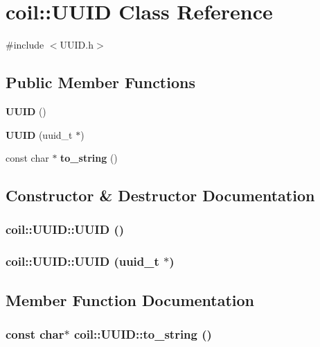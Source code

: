 \section{coil::UUID Class Reference}
\label{classcoil_1_1UUID}


{\ttfamily \#include $<$UUID.h$>$}

\subsection*{Public Member Functions}
\begin{DoxyCompactItemize}
\item 
{\bf UUID} ()
\item 
{\bf UUID} (uuid\_\-t $\ast$)
\item 
const char $\ast$ {\bf to\_\-string} ()
\end{DoxyCompactItemize}


\subsection{Constructor \& Destructor Documentation}
\subsubsection[{UUID}]{\setlength{\rightskip}{0pt plus 5cm}coil::UUID::UUID ()}\label{classcoil_1_1UUID_a625ff4bcb035907ffc4709dbbb8dbb44}
\subsubsection[{UUID}]{\setlength{\rightskip}{0pt plus 5cm}coil::UUID::UUID (uuid\_\-t $\ast$)}\label{classcoil_1_1UUID_a67b865a76894a9a93139de516ac19416}


\subsection{Member Function Documentation}
\subsubsection[{to\_\-string}]{\setlength{\rightskip}{0pt plus 5cm}const char$\ast$ coil::UUID::to\_\-string ()}\label{classcoil_1_1UUID_afd2e095e3ee36081c7b37c89fbe433f6}
